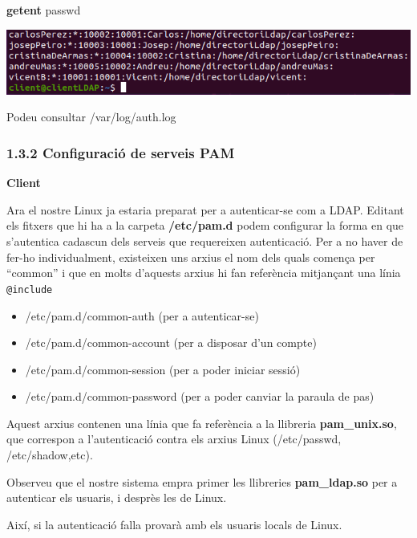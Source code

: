 \documentclass[
  12 pt,
  a4paper,
]{article}
\newenvironment{Shaded}{\begin{snugshade}}{\end{snugshade}}
\newcommand{\FunctionTok}[1]{\textcolor[rgb]{0.13,0.29,0.53}{\textbf{#1}}}
\newcommand{\NormalTok}[1]{#1}
\begin{document}
\begin{Shaded}
\begin{Highlighting}[]
\FunctionTok{getent}\NormalTok{ passwd}
\end{Highlighting}
\end{Shaded}

\includegraphics{png/libpam5.png}

Podeu consultar /var/log/auth.log

\subsubsection{1.3.2 Configuració de serveis
PAM}\label{configuraciuxf3-de-serveis-pam}

\textbf{Client}

Ara el nostre Linux ja estaria preparat per a autenticar-se com a LDAP.
Editant els fitxers que hi ha a la carpeta \textbf{/etc/pam.d} podem
configurar la forma en que s'autentica cadascun dels serveis que
requereixen autenticació. Per a no haver de fer-ho individualment,
existeixen uns arxius el nom dels quals comença per ``common'' i que en
molts d'aquests arxius hi fan referència mitjançant una línia
\texttt{@include}

\begin{itemize}
\item
  /etc/pam.d/common-auth (per a autenticar-se)
\item
  /etc/pam.d/common-account (per a disposar d'un compte)
\item
  /etc/pam.d/common-session (per a poder iniciar sessió)
\item
  /etc/pam.d/common-password (per a poder canviar la paraula de pas)
\end{itemize}

Aquest arxius contenen una línia que fa referència a la llibreria
\textbf{pam\_unix.so}, que correspon a l'autenticació contra els arxius
Linux (/etc/passwd, /etc/shadow,etc).

Observeu que el nostre sistema empra primer les llibreries
\textbf{pam\_ldap.so} per a autenticar els usuaris, i desprès les de
Linux.

Així, si la autenticació falla provarà amb els usuaris locals de Linux.
\end{document}
